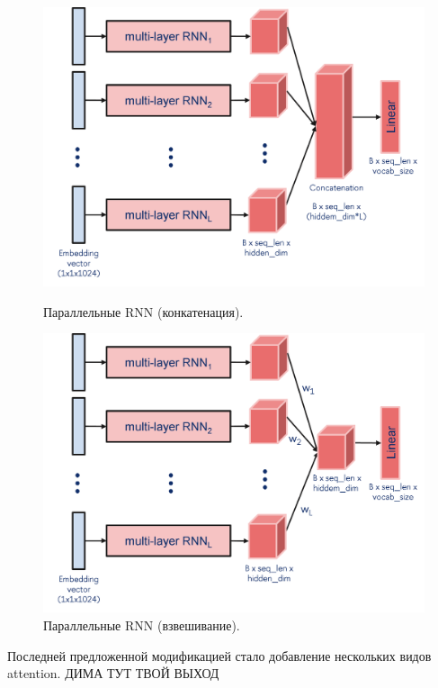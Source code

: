 \documentclass[a4paper,12pt]{extarticle}
\begin{document}
\begin{figure}[ht]
\begin{minipage}[b]{3in}
	\includegraphics[scale=0.5]{rnn-parallel-concatenation.png}
	\caption{Параллельные RNN (конкатенация).}
	\label{fig:rnn-parallel-concatenation}
\end{minipage}
\hfill
\begin{minipage}[b]{3in}
	\includegraphics[scale=0.5]{rnn-parallel-weighted.png}
	\caption{Параллельные RNN (взвешивание).}
	\label{fig:rnn-parallel-weighted}
\end{minipage}
\end{figure}
Последней предложенной модификацией стало добавление нескольких видов attention.
ДИМА ТУТ ТВОЙ ВЫХОД
\end{document}

